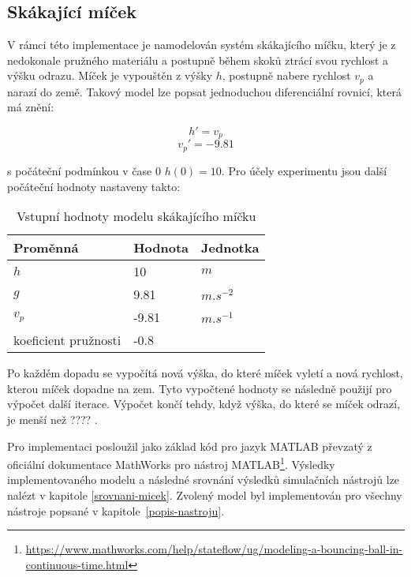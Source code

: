 \subsection{Skákající míček}
V rámci této implementace je namodelován systém skákajícího míčku, který je z nedokonale pružného materiálu a postupně během skoků ztrácí svou rychlost a výšku odrazu. Míček je vypouštěn z výšky $h$, postupně nabere rychlost $v_p$ a narazí do země. Takový model lze popsat jednoduchou diferenciální rovnicí, která má znění:

\begin{equation}
    h' = v_p
\end{equation}
\begin{equation}
    v_p ' = -9.81
\end{equation}

s počáteční podmínkou v čase 0 $h(0) = 10$. Pro účely experimentu jsou další počáteční hodnoty nastaveny takto:

\begin{center}
\begin{table}[ht]
    \centering
\begin{tabular}{|l|l|l|}
\hline
Proměnná             & Hodnota & Jednotka    \\ \hline
$h$                    &   10     & $m$     \\ \hline
$g$                    &    9.81  & $m.s^{-2}$ \\ \hline
$v_p$                   &    -9.81   & $m.s^{-1}$ \\ \hline
koeficient pružnosti &  -0.8    &             \\ \hline
\end{tabular}
    \caption{Vstupní hodnoty modelu skákajícího míčku}
    \label{tab:micek-hodnoty}
\end{table}
\end{center}

Po každém dopadu se vypočítá nová výška, do které míček vyletí a nová rychlost, kterou míček dopadne na zem. Tyto vypočtené hodnoty se následně použijí pro výpočet další iterace. Výpočet končí tehdy, když výška, do které se míček odrazí, je menší než ???? . 

Pro implementaci posloužil jako základ kód pro jazyk MATLAB převzatý z oficiální dokumentace MathWorks pro nástroj MATLAB\footnote{\url{https://www.mathworks.com/help/stateflow/ug/modeling-a-bouncing-ball-in-continuous-time.html}}. Výsledky implementovaného modelu a následné srovnání výsledků simulačních nástrojů lze nalézt v kapitole \ref{srovnani-micek}.
Zvolený model byl implementován pro všechny nástroje popsané v kapitole~\ref{popis-nastroju}.

